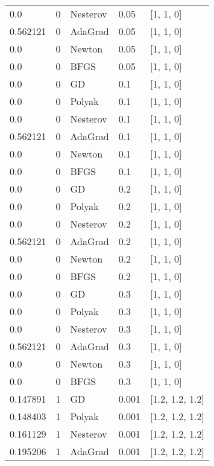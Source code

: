 \begin{tabular}{lllll}
      0.0 &        0 & Nesterov &   0.05 &        [1, 1, 0] \\
 0.562121 &        0 &  AdaGrad &   0.05 &        [1, 1, 0] \\
      0.0 &        0 &   Newton &   0.05 &        [1, 1, 0] \\
      0.0 &        0 &     BFGS &   0.05 &        [1, 1, 0] \\
      0.0 &        0 &       GD &    0.1 &        [1, 1, 0] \\
      0.0 &        0 &   Polyak &    0.1 &        [1, 1, 0] \\
      0.0 &        0 & Nesterov &    0.1 &        [1, 1, 0] \\
 0.562121 &        0 &  AdaGrad &    0.1 &        [1, 1, 0] \\
      0.0 &        0 &   Newton &    0.1 &        [1, 1, 0] \\
      0.0 &        0 &     BFGS &    0.1 &        [1, 1, 0] \\
      0.0 &        0 &       GD &    0.2 &        [1, 1, 0] \\
      0.0 &        0 &   Polyak &    0.2 &        [1, 1, 0] \\
      0.0 &        0 & Nesterov &    0.2 &        [1, 1, 0] \\
 0.562121 &        0 &  AdaGrad &    0.2 &        [1, 1, 0] \\
      0.0 &        0 &   Newton &    0.2 &        [1, 1, 0] \\
      0.0 &        0 &     BFGS &    0.2 &        [1, 1, 0] \\
      0.0 &        0 &       GD &    0.3 &        [1, 1, 0] \\
      0.0 &        0 &   Polyak &    0.3 &        [1, 1, 0] \\
      0.0 &        0 & Nesterov &    0.3 &        [1, 1, 0] \\
 0.562121 &        0 &  AdaGrad &    0.3 &        [1, 1, 0] \\
      0.0 &        0 &   Newton &    0.3 &        [1, 1, 0] \\
      0.0 &        0 &     BFGS &    0.3 &        [1, 1, 0] \\
 0.147891 &        1 &       GD &  0.001 &  [1.2, 1.2, 1.2] \\
 0.148403 &        1 &   Polyak &  0.001 &  [1.2, 1.2, 1.2] \\
 0.161129 &        1 & Nesterov &  0.001 &  [1.2, 1.2, 1.2] \\
 0.195206 &        1 &  AdaGrad &  0.001 &  [1.2, 1.2, 1.2] \\

\end{tabular}

